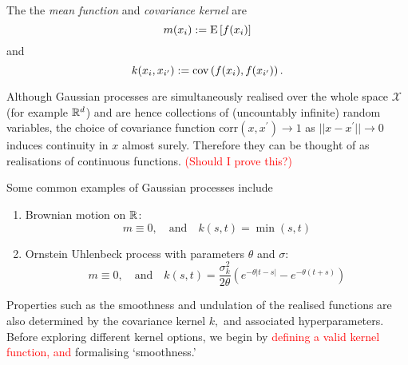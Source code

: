 \begin{definition}\label{def:mean_kernel}
    The the \emph{mean function} and \emph{covariance kernel} are
    $$m(x_i) := \operatorname{E}\left[f(x_i)\right]$$ and
    $$k(x_{i}, x_{i^\prime}) := \operatorname{cov}\left(f(x_i), f(x_{i^\prime})\right).$$
\end{definition}

Although Gaussian processes are simultaneously realised over the whole space
$\mathcal{X}$ (for example $\mathbb{R}^d$) and are hence collections of 
(uncountably infinite)
random variables, the choice of covariance function
$\mathrm{corr}(x, x^\prime) \to 1$ as $||x - x^\prime||\to 0$
induces continuity in $x$ almost
surely. Therefore they can be thought of as realisations of continuous 
functions.
\textcolor{red}{(Should I prove this?)}

Some common examples of Gaussian processes include \begin{enumerate}
    \item Brownian motion on $\mathbb{R}$:
          $$m\equiv 0, \quad \text{and}\quad k(s, t) = \min(s, t)$$
    \item Ornstein Uhlenbeck process with parameters $\theta$ and $\sigma$:
          $$
              m\equiv 0, \quad \text{and}
              \quad k(s, t)
              = \frac{\sigma^2_k}{2\theta} \left(
              e^{-\theta|t - s|} - e^{-\theta(t + s)}
              \right)
          $$
\end{enumerate}


Properties such as the smoothness and undulation of the
realised functions are also determined by the
covariance kernel $k,$ and associated hyperparameters. Before exploring
different kernel options, we begin by
\textcolor{red}{defining a valid kernel function, and} formalising `smoothness.'

